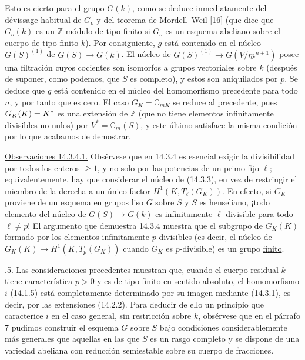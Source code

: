 Esto es cierto para el grupo $G(k)$, como se deduce inmediatamente del
dévissage habitual de $G_o$ y del \underline{teorema de Mordell--Weil}
[16] (que dice que $G_o(k)$ es un $\mathbb Z$-módulo de tipo finito si
$G_o$ es un esquema abeliano sobre el cuerpo de tipo finito $k$). Por
consiguiente, $g$ está contenido en el núcleo $G(S)^{(1)}$ de
$G(S)\longrightarrow G(k)$. El núcleo de
$G(S)^{(1)}\longrightarrow G(V/\underline m^{n+1})$ posee una
filtración cuyos cocientes son isomorfos a grupos vectoriales sobre $k$
(después de suponer, como podemos, que $S$ es completo), y estos son
aniquilados por $p$. Se deduce que $g$ está contenido en el núcleo del
homomorfismo precedente para todo $n$, y por tanto que es cero. El caso
$G_K=\mathbb G_{mK}$ se reduce al precedente, pues
$G_K(K)=K^*$ es una extensión de $\mathbb Z$
(que no tiene elementos infinitamente divisibles no nulos) por
$V^*=\mathbb G_m(S)$, y este último satisface la misma condición por lo
que acabamos de demostrar.

\medskip
\noindent
\underline{Observaciones 14.3.4.1.} Obsérvese que en 14.3.4 es esencial
exigir la divisibilidad por \underline{todos} los enteros $\geq1$, y no
solo por las potencias de un primo fijo $\ell$; equivalentemente, hay
que considerar el núcleo de (14.3.3), en vez de restringir el miembro
de la derecha a un único factor $H^1(K,T_\ell(G_K))$. En efecto, si
$G_K$ proviene de un esquema en grupos liso $G$ sobre $S$ y $S$ es
henseliano, ¡todo elemento del núcleo de
$G(S)\longrightarrow G(k)$ es infinitamente $\ell$-divisible para todo
$\ell\neq p$! El argumento que demuestra 14.3.4 muestra que el subgrupo
de $G_K(K)$ formado por los elementos infinitamente $p$-divisibles (es
decir, el núcleo de
$G_K(K)\longrightarrow H^1(K,T_p(G_K))$ cuando $G_K$ es $p$-divisible)
es un grupo \underline{finito}.


\medskip
{}.5. Las consideraciones precedentes muestran que, cuando el cuerpo
residual $k$ tiene característica $p>0$ y es de tipo finito en sentido
absoluto, el homomorfismo $i$ (14.1.5) está completamente determinado
por su imagen mediante (14.3.1), es decir, por las extensiones
(14.2.2). Para deducir de ello un principio que caracterice $i$ en el
caso general, sin restricción sobre $k$, obsérvese que en el párrafo 7
pudimos construir el esquema $G$ sobre $S$ bajo condiciones
considerablemente más generales que aquellas en las que $S$ es un
rasgo completo y se dispone de una variedad abeliana con reducción
semiestable sobre su cuerpo de fracciones.

